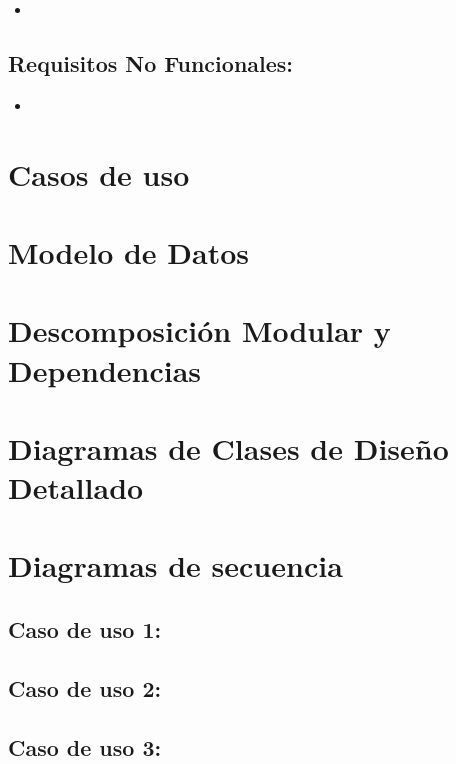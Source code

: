 \documentclass{article}
\begin{document}
        	\begin{itemize}
        		\item 
        	\end{itemize}

    	\subsection{Requisitos No Funcionales: }
        	
            \begin{itemize}
        		\item 
        	\end{itemize}

	\clearpage   
    \section{Casos de uso}

	\clearpage
    \section{Modelo de Datos}

	\clearpage
    \section{Descomposición Modular y Dependencias}
	
    
    \clearpage
    \section{Diagramas de Clases de Diseño Detallado}

	\clearpage
	\section{Diagramas de secuencia}
    
    	\subsection{Caso de uso 1: }

    	\subsection{Caso de uso 2: }

    	\subsection{Caso de uso 3: }
  
		
\end{document}
